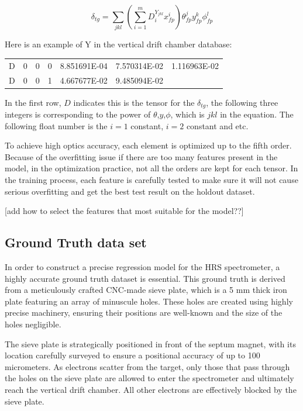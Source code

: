 \begin{equation}
    \delta_{tg} = \sum_{jkl}(\sum^m_{i=1}D_i^{Y_{jkl}}x^i_{fp})\theta^j_{fp}y^k_{fp}\phi^l_{fp}
\end{equation}

Here is an example of Y in the vertical drift chamber database:

\begin{center}
    \begin{tabular}{c c c c c c c }
        D& 0& 0& 0&  8.851691E-04& 7.570314E-02& 1.116963E-02\\
        D& 0& 0& 1&  4.667677E-02& 9.485094E-02&
    \end{tabular}    
\end{center}

In the first row, $D$ indicates this is the tensor for the $\delta_{tg}$, the following three integers is corresponding to the power of $\theta$,$y$,$\phi$, which is $jkl$ in the equation. The following float number is the $i=1$ constant, $i=2$ constant and etc. 


To achieve high optics accuracy, each element is optimized up to the fifth order. Because of the overfitting issue if there are too many features present in the model, in the optimization practice, not all the orders are kept for each tensor. In the training process, each feature is carefully tested to make sure it will not cause serious overfitting and get the best test result on the holdout dataset. 

[add how to select the features that most suitable for the model??]

\subsection{Ground Truth data set}

In order to construct a precise regression model for the HRS spectrometer, a highly accurate ground truth dataset is essential. This ground truth is derived from a meticulously crafted CNC-made sieve plate, which is a 5 mm thick iron plate featuring an array of minuscule holes. These holes are created using highly precise machinery, ensuring their positions are well-known and the size of the holes negligible.

The sieve plate is strategically positioned in front of the septum magnet, with its location carefully surveyed to ensure a positional accuracy of up to 100 micrometers. As electrons scatter from the target, only those that pass through the holes on the sieve plate are allowed to enter the spectrometer and ultimately reach the vertical drift chamber. All other electrons are effectively blocked by the sieve plate.

